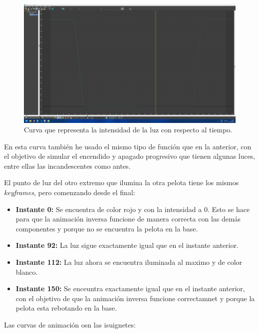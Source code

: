 \documentclass{article}
\begin{document}
 \begin{figure}[H]
    \centering
    \includegraphics[width=\textwidth]{imagenes/curvas/LL/intensity.png}
    \caption{Curva que representa la intensidad de la luz con respecto al tiempo.}
 \end{figure}

 En esta curva también he usado el mismo tipo de función que en la anterior, con el objetivo de simular el encendido y apagado progresivo que tienen algunas luces, entre ellas las incandescentes como antes.

 \bigskip

 El punto de luz del otro extremo que ilumina la otra pelota tiene los mismos \textit{keyframes}, pero comenzando desde el final:

 \begin{itemize}
    \item \textbf{Instante 0: }Se encuentra de color rojo y con la intensidad a 0. Esto se hace para que la animación inversa funcione de manera correcta con las demás componentes y porque no se encuentra la pelota en la base.
    \item \textbf{Instante 92: }La luz sigue exactamente igual que en el instante anterior.
    \item \textbf{Instante 112: }La luz ahora se encuentra iluminada al maximo y de color blanco.
    \item \textbf{Instante 150: }Se enceuntra exactamente igual que en el instante anterior, con el objetivo de que la animación inversa funcione correctamnet y porque la pelota esta rebotando en la base.
 \end{itemize}
 
Las curvas de animación osn las isuignetes:
\end{document}
